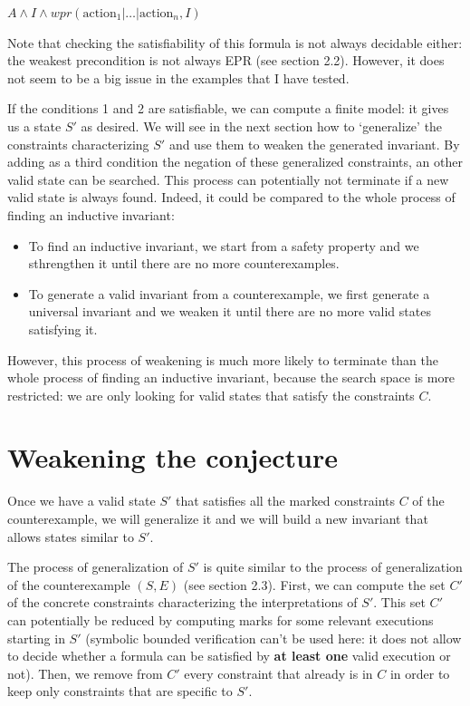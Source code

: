 \documentclass[11pt,a4paper,oldfontcommands,openany]{memoir}
\begin{document}
    \(A \land I \land wpr(\text{action}_1|\ldots|\text{action}_n,I)\)

    Note that checking the satisfiability of this formula is not always decidable either: the weakest precondition is not always EPR (see section 2.2).
    However, it does not seem to be a big issue in the examples that I have tested.

    If the conditions 1 and 2 are satisfiable, we can compute a finite model: it gives us a state \(S'\) as desired.
    We will see in the next section how to `generalize' the constraints characterizing \(S'\) and use them to weaken the generated invariant.
    By adding as a third condition the negation of these generalized constraints, an other valid state can be searched.
    This process can potentially not terminate if a new valid state is always found. Indeed, it could be compared to the whole process of finding an inductive invariant:
    \begin{itemize}
        \item To find an inductive invariant, we start from a safety property and we sthrengthen it until there are no more counterexamples.
        \item To generate a valid invariant from a counterexample, we first generate a universal invariant and we weaken it until there are no more valid states satisfying it.
    \end{itemize}
    However, this process of weakening is much more likely to terminate than the whole process of finding an inductive invariant, because the search space is more restricted:
    we are only looking for valid states that satisfy the constraints \(C\).

    \section{Weakening the conjecture}

    Once we have a valid state \(S'\) that satisfies all the marked constraints \(C\) of the counterexample,
    we will generalize it and we will build a new invariant that allows states similar to \(S'\).

    The process of generalization of \(S'\) is quite similar to the process of generalization of the counterexample \((S,E)\) (see section 2.3).
    First, we can compute the set \(C'\) of the concrete constraints characterizing the interpretations of \(S'\).
    This set \(C'\) can potentially be reduced by computing marks for some relevant executions starting in \(S'\)
    (symbolic bounded verification can't be used here: it does not allow to decide whether a formula can be satisfied by \textbf{at least one} valid execution or not).
    Then, we remove from \(C'\) every constraint that already is in \(C\) in order to keep only constraints that are specific to \(S'\).
\end{document}
